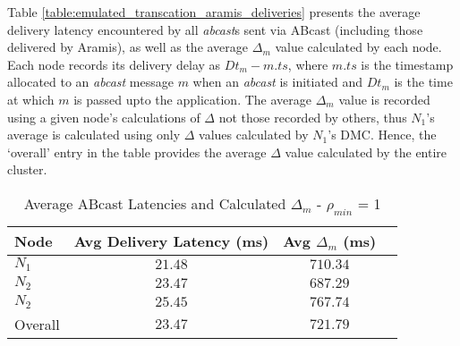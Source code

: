     Table \ref{table:emulated_transcation_aramis_deliveries} presents the average delivery latency encountered by all \emph{abcast}s sent via \textsf{ABcast} (including those delivered by \textsf{Aramis}), as well as the average $\Delta_m$ value calculated by each node.  Each node records its delivery delay as $Dt_m - m.ts$, where $m.ts$ is the timestamp allocated to an \emph{abcast} message $m$ when an \emph{abcast} is initiated and $Dt_m$ is the time at which $m$ is passed upto the application.  The average $\Delta_m$ value is recorded using a given node's calculations of $\Delta$ not those recorded by others, thus $N_1$'s average is calculated using only $\Delta$ values calculated by $N_1$'s DMC.  Hence, the \textquoteleft{}overall' entry in the table provides the average $\Delta$ value calculated by the entire cluster.  
    
\begin{table}[p]
  \begin{center}
  \renewcommand{\arraystretch}{1.3}
   \begin{tabular}{|l|c|c|c|}
    \hline
    Node      & Avg Delivery Latency (ms) & Avg $\Delta_m$ (ms) \\ \hline \hline
    $N_1$   & $21.48$                           & $710.34$                   \\ \hline
    $N_2$   & $23.47$                           & $687.29$                  \\ \hline
    $N_2$   & $25.45$                           & $767.74$                   \\ \hline \hline
    Overall   & $23.47$                           & $721.79$                 \\ \hline
    \end{tabular}
    \caption{Average \textsf{ABcast} Latencies and Calculated $\Delta_m$ - $\rho_{min}$ = 1}
    \label{table:infinite_clients_aramis_latencies}
  \end{center}
\end{table}       

